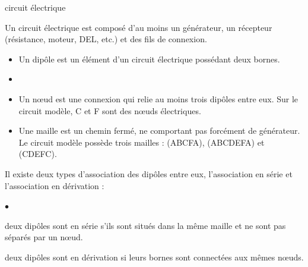 \documentclass[24pt]{article}
\begin{document}
\begin{concept}{circuit électrique}\begin{minipage}[c]{0.75\textwidth}

        Un circuit électrique est composé d’au moins un générateur, un récepteur
        (résistance, moteur, DEL, etc.) et des fils de connexion.

        \begin{itemize}
            \item Un dipôle est un élément d’un circuit électrique possédant deux bornes.
            \item
            \item Un nœud est une connexion qui relie au moins trois dipôles entre eux. Sur
                  le circuit modèle, C et F sont des nœuds électriques.

            \item Une maille est un chemin fermé, ne comportant pas forcément de générateur.
                  Le circuit modèle possède trois mailles : (ABCFA), (ABCDEFA) et (CDEFC).
        \end{itemize}
        \vspace{5pt}

        Il existe deux types d’association des dipôles entre eux,
        l’association en série et l’association en dérivation :
        \begin{list}{$\bullet$}{}
            \item deux dipôles sont en série s'ils sont situés dans la même maille et ne sont pas
                  séparés par un nœud.

            \item deux dipôles sont en dérivation si leurs bornes sont connectées aux mêmes nœuds.
        \end{list}


\end{minipage}
\end{concept}
\end{document}
